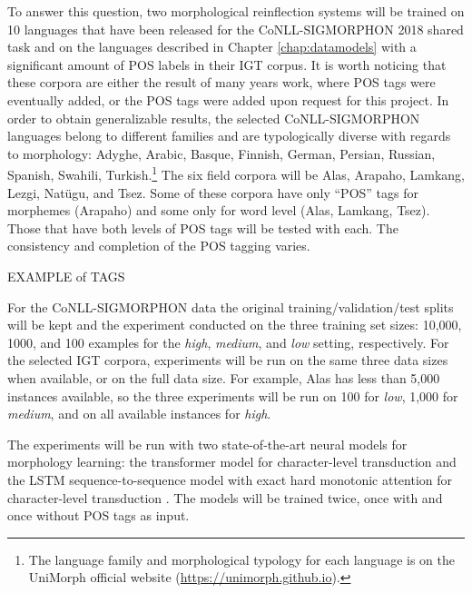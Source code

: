 To answer this question, two morphological reinflection systems will be trained on 10 languages that have been released for the CoNLL-SIGMORPHON 2018 shared task \citep{cotterell-etal-2018-conll} and on the languages described in Chapter \ref{chap:datamodels} with a significant amount of POS labels in their IGT corpus. It is worth noticing that these corpora are either the result of many years work, where POS tags were eventually added, or the POS tags were added upon request for this project. In order to obtain generalizable results, the selected CoNLL-SIGMORPHON languages belong to different families and are typologically diverse with regards to morphology: Adyghe, Arabic, Basque, Finnish, German, Persian, Russian, Spanish, Swahili, Turkish.\footnote{The language family and morphological typology for each language is on the UniMorph official website (\url{https://unimorph.github.io}).} The six field corpora will be Alas, Arapaho, Lamkang, Lezgi, Natügu, and Tsez. Some of these corpora have only ``POS'' tags for morphemes (Arapaho) and some only for word level (Alas, Lamkang, Tsez). Those that have both levels of POS tags will be tested with each. The consistency and completion of the POS tagging varies.  

EXAMPLE of TAGS

For the CoNLL-SIGMORPHON data the original training/validation/test splits will be kept and the experiment conducted on the three training set sizes: 10,000, 1000, and 100 examples for the \textit{high}, \textit{medium}, and \textit{low} setting, respectively. For the selected IGT corpora, experiments will be run on the same three data sizes when available, or on the full data size. For example, Alas has less than 5,000 instances available, so the three experiments will be run on 100 for \textit{low}, 1,000 for \textit{medium}, and on all available instances for \textit{high}.  

The experiments will be run with two state-of-the-art neural models for morphology learning: the transformer model for character-level transduction \citep{wu2020applying} and the LSTM sequence-to-sequence model with exact hard monotonic attention for character-level transduction \citep{wu-cotterell-2019-exact}.
The models will be trained twice, once with and once without POS tags as input. 

